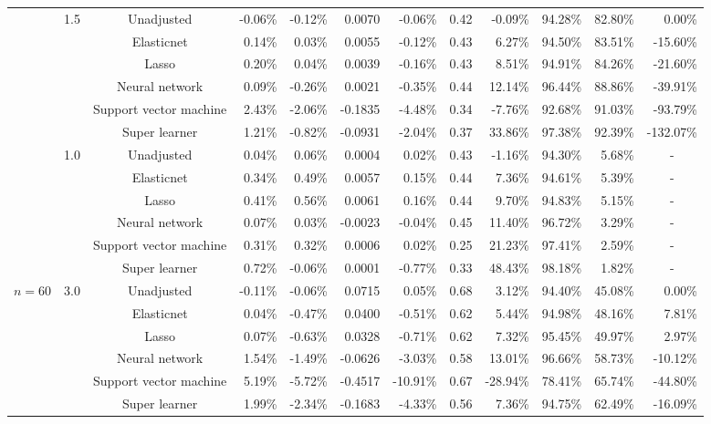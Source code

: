 \documentclass{article}
\begin{document}
\begin{center}
\begin{table}[!ht]
\begin{tabular*}{\textwidth}{@{\extracolsep\fill}c|c|c|rrrr|rrrrr}
        ~ & \multirow{6}{*}{1.5} & Unadjusted & -0.06\% & -0.12\% & 0.0070 & -0.06\% & 0.42 & -0.09\% & 94.28\% & 82.80\% & 0.00\% \\ 
        ~ & ~ & Elasticnet & 0.14\% & 0.03\% & 0.0055 & -0.12\% & 0.43 & 6.27\% & 94.50\% & 83.51\% & -15.60\% \\ 
        ~ & ~ & Lasso & 0.20\% & 0.04\% & 0.0039 & -0.16\% & 0.43 & 8.51\% & 94.91\% & 84.26\% & -21.60\% \\ 
        ~ & ~ & Neural network & 0.09\% & -0.26\% & 0.0021 & -0.35\% & 0.44 & 12.14\% & 96.44\% & 88.86\% & -39.91\% \\ 
        ~ & ~ & Support vector machine & 2.43\% & -2.06\% & -0.1835 & -4.48\% & 0.34 & -7.76\% & 92.68\% & 91.03\% & -93.79\% \\ 
        ~ & ~ & Super learner & 1.21\% & -0.82\% & -0.0931 & -2.04\% & 0.37 & 33.86\% & 97.38\% & 92.39\% & -132.07\% \\    \cline{2-12}
        
        ~ & \multirow{6}{*}{1.0} & Unadjusted & 0.04\% & 0.06\% & 0.0004 & 0.02\% & 0.43 & -1.16\% & 94.30\% & 5.68\% & \multicolumn{1}{c}{-} \\ 
        ~ & ~ & Elasticnet & 0.34\% & 0.49\% & 0.0057 & 0.15\% & 0.44 & 7.36\% & 94.61\% & 5.39\% & \multicolumn{1}{c}{-} \\ 
        ~ & ~ & Lasso & 0.41\% & 0.56\% & 0.0061 & 0.16\% & 0.44 & 9.70\% & 94.83\% & 5.15\% & \multicolumn{1}{c}{-} \\ 
        ~ & ~ & Neural network & 0.07\% & 0.03\% & -0.0023 & -0.04\% & 0.45 & 11.40\% & 96.72\% & 3.29\% & \multicolumn{1}{c}{-} \\ 
        ~ & ~ & Support vector machine & 0.31\% & 0.32\% & 0.0006 & 0.02\% & 0.25 & 21.23\% & 97.41\% & 2.59\% & \multicolumn{1}{c}{-} \\ 
        ~ & ~ & Super learner & 0.72\% & -0.06\% & 0.0001 & -0.77\% & 0.33 & 48.43\% & 98.18\% & 1.82\% & \multicolumn{1}{c}{-} \\        \hline
        
        
        
         \multirow{18}{*}{$n = 60$} & \multirow{7}{*}{3.0} & Unadjusted & -0.11\% & -0.06\% & 0.0715 & 0.05\% & 0.68 & 3.12\% & 94.40\% & 45.08\% & 0.00\% \\ 
        ~ & ~ & Elasticnet & 0.04\% & -0.47\% & 0.0400 & -0.51\% & 0.62 & 5.44\% & 94.98\% & 48.16\% & 7.81\% \\ 
        ~ & ~ & Lasso & 0.07\% & -0.63\% & 0.0328 & -0.71\% & 0.62 & 7.32\% & 95.45\% & 49.97\% & 2.97\% \\
        ~ & ~ & Neural network & 1.54\% & -1.49\% & -0.0626 & -3.03\% & 0.58 & 13.01\% & 96.66\% & 58.73\% & -10.12\% \\ 
        ~ & ~ & Support vector machine & 5.19\% & -5.72\% & -0.4517 & -10.91\% & 0.67 & -28.94\% & 78.41\% & 65.74\% & -44.80\% \\ 
        ~ & ~ & Super learner & 1.99\% & -2.34\% & -0.1683 & -4.33\% & 0.56 & 7.36\% & 94.75\% & 62.49\% & -16.09\% \\      \cline{2-12}
        

\end{tabular*}
\end{table}
\end{center}
\end{document}
